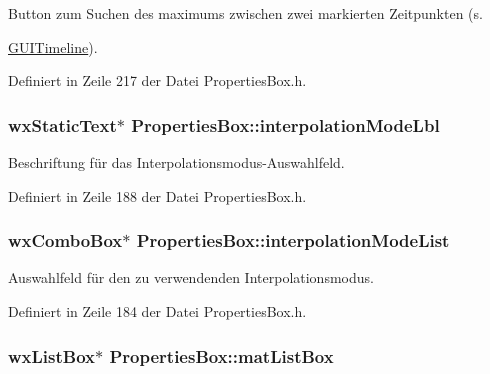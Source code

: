 Button zum Suchen des maximums zwischen zwei markierten Zeitpunkten (s. 

\hyperlink{classGUITimeline}{G\-U\-I\-Timeline}). 

Definiert in Zeile 217 der Datei Properties\-Box.\-h.

\hypertarget{classPropertiesBox_a7184c404a73e32cee30ac299ef9fe649}{
\subsubsection[{interpolation\-Mode\-Lbl}]{\setlength{\rightskip}{0pt plus 5cm}wx\-Static\-Text$\ast$ Properties\-Box\-::interpolation\-Mode\-Lbl\hspace{0.3cm}{\ttfamily [private]}}}\label{classPropertiesBox_a7184c404a73e32cee30ac299ef9fe649}


Beschriftung für das Interpolationsmodus-\/\-Auswahlfeld. 



Definiert in Zeile 188 der Datei Properties\-Box.\-h.

\hypertarget{classPropertiesBox_a3f5165a466fd9204f758a6fbb17507ae}{
\subsubsection[{interpolation\-Mode\-List}]{\setlength{\rightskip}{0pt plus 5cm}wx\-Combo\-Box$\ast$ Properties\-Box\-::interpolation\-Mode\-List\hspace{0.3cm}{\ttfamily [private]}}}\label{classPropertiesBox_a3f5165a466fd9204f758a6fbb17507ae}


Auswahlfeld für den zu verwendenden Interpolationsmodus. 



Definiert in Zeile 184 der Datei Properties\-Box.\-h.

\hypertarget{classPropertiesBox_affd4774a26bd75a30c1d1c07d02edd18}{
\subsubsection[{mat\-List\-Box}]{\setlength{\rightskip}{0pt plus 5cm}wx\-List\-Box$\ast$ Properties\-Box\-::mat\-List\-Box\hspace{0.3cm}{\ttfamily [private]}}}\label{classPropertiesBox_affd4774a26bd75a30c1d1c07d02edd18}


